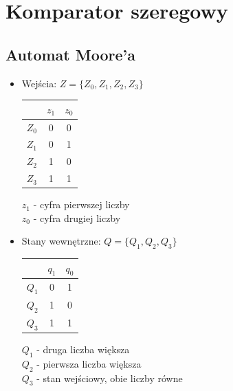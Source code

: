 \documentclass[12pt,a4paper]{article}
\begin{document}
		
	\section{Komparator szeregowy}
	
		\subsection{Automat Moore'a}
		
		\begin{itemize}
			\item Wejścia: \(Z = \{Z_0, Z_1, Z_2, Z_3\}\)\\
			
			\begin{minipage}{{.5\textwidth}}
				\centering
				\begin{tabular}{r|cc}
					&	\(z_1\)	&	\(z_0\)\\\hline
					\(Z_0\)	&	0	&	0	\\
					\(Z_1\)	&	0	&	1	\\
					\(Z_2\)	&	1	&	0	\\
					\(Z_3\)	&	1	&	1	\\
				\end{tabular}
			\end{minipage}%
			\begin{minipage}{{.5\textwidth}}
				\(z_1\) - cyfra pierwszej liczby\\
				\(z_0\) - cyfra drugiej liczby
			\end{minipage}
			
			\newpage
			\item Stany wewnętrzne: \(Q =\{Q_1, Q_2, Q_3\}\)\\
			
			\begin{minipage}{{.5\textwidth}}
				\centering
				\begin{tabular}{r|cc}
					&	\(q_1\)	&	\(q_0\)\\\hline
					\(Q_1\)	&	0	&	1	\\
					\(Q_2\)	&	1	&	0	\\
					\(Q_3\)	&	1	&	1	\\
				\end{tabular}
			\end{minipage}%
			\begin{minipage}{{.5\textwidth}}	
				\(Q_1\) - druga liczba większa\\
				\(Q_2\) - pierwsza liczba większa\\
				\(Q_3\) - stan wejściowy, obie liczby równe\\
			\end{minipage}
			

\end{itemize}
\end{document}
